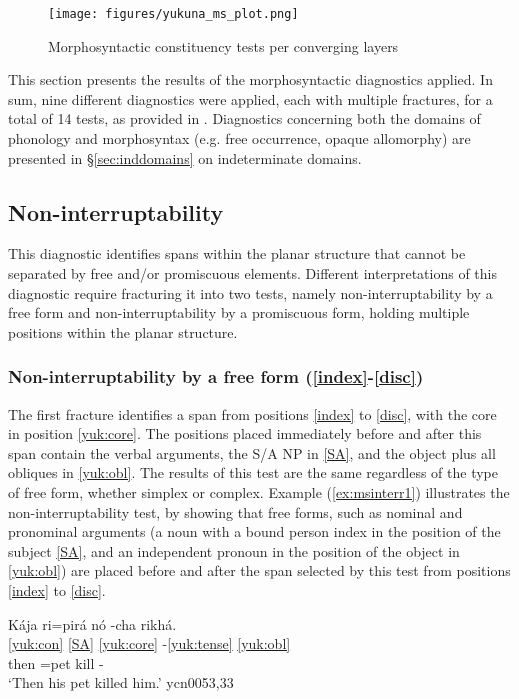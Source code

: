 \documentclass[output=paper]{langscibook}
\begin{document}
\begin{figure}[p]
\centering
\texttt{[image: figures/yukuna\_ms\_plot.png]}
\caption{Morphosyntactic constituency tests per converging layers}
\label{fig:3}
\end{figure}

This section presents the results of the morphosyntactic diagnostics applied. In sum, nine different diagnostics were applied, each with multiple fractures, for a total of 14 tests, as provided in . Diagnostics concerning both the domains of phonology and morphosyntax (e.g. free occurrence, opaque allomorphy) are presented in §\ref{sec:inddomains} on indeterminate domains.


\subsection{Non-interruptability}
\label{ss:non-interr}

This diagnostic identifies spans within the planar structure that cannot be separated by free and/or promiscuous elements. Different interpretations of this diagnostic require fracturing it into two tests, namely non-interruptability by a free form and non-interruptability by a promiscuous form, holding multiple positions within the planar structure.

\subsubsection{Non-interruptability by a free form (\ref{index}-\ref{disc})}
The first fracture identifies a span from positions \ref{index} to \ref{disc}, with the core in position \ref{yuk:core}. The positions placed immediately before and after this span contain the verbal arguments, the S/A NP in \ref{SA}, and the object plus all obliques in \ref{yuk:obl}. The results of this test are the same regardless of the type of free form, whether simplex or complex. Example (\ref{ex:msinterr1}) illustrates the non-interruptability test, by showing that free forms, such as nominal and pronominal arguments (a noun with a bound person index in the position of the subject \ref{SA}, and an independent pronoun in the position of the object in \ref{yuk:obl}) are placed before and after the span selected by this test from positions \ref{index} to \ref{disc}.

\ea \label{ex:msinterr1}
     \glll Kája ri=pirá nó -cha rikhá. \\
         \ref{yuk:con} \ref{SA} \ref{yuk:core} -\ref{yuk:tense} \ref{yuk:obl} \\
         then \Tsg{}=pet kill -\Pst{} \Tsg{} \\
    \glt `Then his pet killed him.' \hfill ycn0053,33
\z
\end{document}
